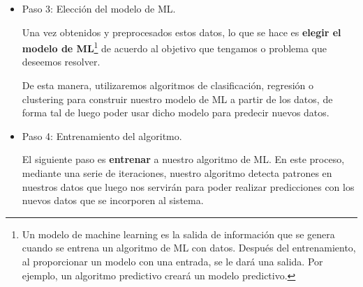 \documentclass[12pt,a4paper]{article}
\begin{document}
\begin{sloppypar}
\begin{itemize}
En este paso generalmente se realizan visualizaciones de los datos y se revisa si existen correlaciones entre las distintas “features”\footnote{Features generalmente son las columnas de nuestro dataframe, archivo o base de datos -dependiendo cómo almacenamos nuestros datos-.} de nuestros datos. Al pre-procesar nuestros datos nos referimos a normalizar los mismos: eliminando duplicados y realizando distintas correcciones de errores. El preprocesamiento de datos usualmente tiene un impacto significativo en la performance de generalización de nuestro algoritmo de machine learning\cite{preprocessing}. 

\cleardoublepage
En esta etapa, además, es importante \textbf{separar} nuestros datos en dos grupos:
\begin{itemize}
\item un set de entrenamiento.
\item un set de prueba. 
\end{itemize}

Como mencionamos previamente, el set de test en general es un 20\% o 30\% del set de entrenamiento. Esta partición de los datos en estos dos conjuntos diferenciados permite generar el modelo a partir de los datos de entrenamiento para después comprobar su eficiencia con los datos reservados para test.\\

\item Paso 3: Elección del modelo de ML.

Una vez obtenidos y preprocesados estos datos, lo que se hace es \textbf{elegir el modelo de ML}\footnote{Un modelo de machine learning es la salida de información que se genera cuando se entrena un algoritmo de ML con datos. Después del entrenamiento, al proporcionar un modelo con una entrada, se le dará una salida. Por ejemplo, un algoritmo predictivo creará un modelo predictivo.} de acuerdo al objetivo que tengamos o problema que deseemos resolver. 

De esta manera, utilizaremos algoritmos de clasificación, regresión o clustering para construir nuestro modelo de ML a partir de los datos, de forma tal de luego poder usar dicho modelo para predecir nuevos datos.\\

\item Paso 4: Entrenamiento del algoritmo.

El siguiente paso es \textbf{entrenar} a nuestro algoritmo de ML. En este proceso, mediante una serie de iteraciones, nuestro algoritmo detecta patrones en nuestros datos que luego nos servirán para poder realizar predicciones con los nuevos datos que se incorporen al sistema.


\end{itemize}
\end{sloppypar}
\end{document}
